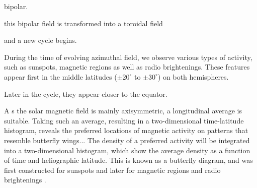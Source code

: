 \documentclass{aa}
\begin{document}
bipolar.

this bipolar field is transformed into a
toroidal field 


and a new cycle begins. 

During the time of evolving azimuthal field, we observe various types of activity, such as sunspots, magnetic regions as well as radio brightenings. These features appear first in the middle latitudes ($\pm 
20^{\circ}$ to $\pm 30^{\circ}$) on both hemispheres. 


Later in the cycle, they appear closer to the equator. 

A
s the solar magnetic field is mainly axisymmetric, a longitudinal average is suitable. Taking such an average, resulting in a two-dimensional time-latitude histogram, reveals the preferred locations of magnetic activity on patterns that resemble butterfly wings...
The 
density of a preferred activity will be integrated into a two-dimensional histogram, which show the average density as a 
function of time and heliographic latitude. This is known as a butterfly diagram, and was first constructed for 
sunspots and later for magnetic regions and radio brightenings \cite{metsahovi40}.
\end{document}
